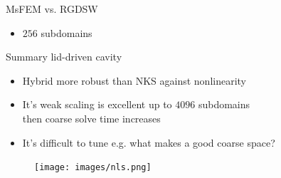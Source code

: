 \begin{frame}{MsFEM vs. RGDSW}
	\begin{itemize}
		\item $256$ subdomains
	\end{itemize}
	\begin{figure}
		\centering
		
		\label{fig:msfem-vs-rgdsw}
	\end{figure}
\end{frame}

\begin{frame}{Summary lid-driven cavity}
	\begin{itemize}
    \item Hybrid more robust than NKS against nonlinearity
    \item It's weak scaling is excellent up to $4096$ subdomains\\then coarse solve time increases %
		\item It's difficult to tune e.g. what makes a good coarse space?%
	\end{itemize}

	\begin{figure}
		\texttt{[image: images/nls.png]}
	\end{figure}
\end{frame}


